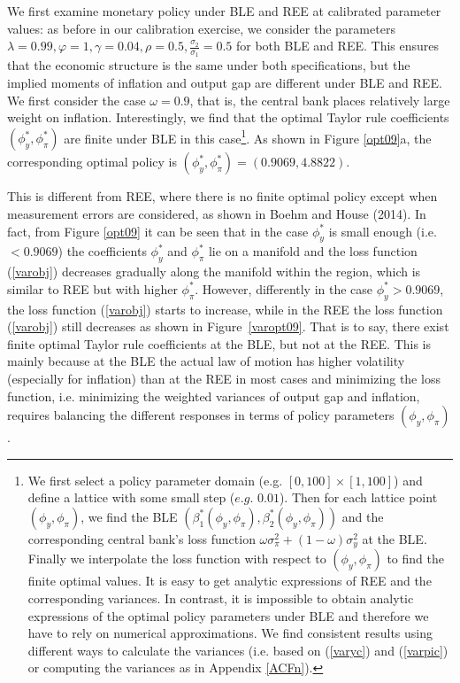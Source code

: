         We first examine monetary policy under BLE and REE at calibrated parameter values: as before in our calibration exercise, we consider the parameters $\lambda=0.99, \varphi=1, \gamma=0.04, \rho=0.5, \frac{\sigma_2}{\sigma_1}=0.5$ for both BLE and REE. This ensures that the economic structure is the same under both specifications, but the implied moments of inflation and output gap are different under BLE and REE.
       We first consider the case $\omega=0.9$, that is, the central bank places relatively large weight on inflation. Interestingly, we find that the optimal Taylor rule coefficients $(\phi_y^*, \phi_\pi^*)$ are finite under BLE in this case\footnote{
We first select a policy parameter domain (e.g. $[0,100]\times[1,100]$) and define a lattice with some small step ($e.g. \,\,0.01$). Then for each lattice point $(\phi_y, \phi_\pi)$, we find the BLE $(\beta_1^*(\phi_y, \phi_\pi), \beta_2^*(\phi_y, \phi_\pi))$ and the corresponding central bank's loss function $\omega\sigma_\pi^2+(1-\omega)\sigma_y^2$ at the BLE. Finally we interpolate the loss function with respect to $(\phi_y, \phi_\pi)$ to find the finite optimal values. It is easy to get analytic expressions of REE and the corresponding variances. In contrast, it is impossible to obtain analytic expressions of the optimal policy parameters under BLE and  therefore we have to rely on numerical approximations. We find consistent results using different ways to calculate the variances (i.e. based on (\ref{varyc}) and (\ref{varpic}) or computing the variances as in Appendix \ref{ACFn}).}.
As shown in Figure \ref{opt09}a, the corresponding optimal policy is $(\phi_y^*, \phi_\pi^*)=(0.9069, 4.8822)$.

This is different from REE, where there is no finite optimal policy except when measurement errors are considered, as shown in Boehm and House (2014). In fact, from Figure \ref{opt09} it can be seen that in the case $\phi_y^*$ is small enough (i.e. $<0.9069$) the coefficients $\phi_y^*$ and $\phi_\pi^*$ lie on a manifold and the loss function (\ref{varobj}) decreases gradually along the manifold within the region, which is similar to REE but with higher $\phi_\pi^*$. However, differently in the case $\phi_y^*>0.9069$, the loss function (\ref{varobj}) starts to increase, while in the REE the loss function (\ref{varobj}) still decreases as shown in Figure~\ref{varopt09}. That is to say, there exist finite optimal Taylor rule coefficients at the BLE, but not at the REE. This is mainly because at the BLE the actual law of motion has higher volatility (especially for inflation) than at the REE in most cases and minimizing the loss function, i.e. minimizing the weighted variances of output gap and inflation, requires balancing the different responses in terms of policy parameters $(\phi_y, \phi_\pi)$.


